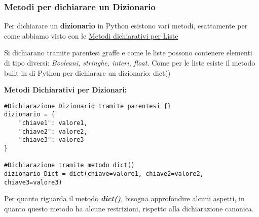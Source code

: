 


\subsubsection{Metodi per dichiarare un Dizionario}\label{DictDichiarazione}
Per dichiarare un \textbf{dizionario} in Python esistono vari metodi, esattamente per come abbiamo visto con le \hyperref[ListeCap1]{Metodi dichiarativi per Liste}

Si dichiarano tramite parentesi graffe \textit{\textbf{{}}} e come le liste possono contenere elementi di tipo diversi: \textit{Booleani, stringhe, interi, float.} Come per le liste esiste il metodo built-in di Python per dichiarare un dizionario: dict()

\vspace{0.5cm}
\textbf{Metodi Dichiarativi per Dizionari:}
\begin{lstlisting}
#Dichiarazione Dizionario tramite parentesi {}
dizionario = {
    "chiave1": valore1,
    "chiave2": valore2,
    "chiave3": valore3
}

#Dichiarazione tramite metodo dict()
dizionario_Dict = dict(chiave=valore1, chiave2=valore2, chiave3=valore3)
\end{lstlisting}
\vspace{0.5cm}
Per quanto riguarda il metodo \textit{\textbf{dict()}}, bisogna approfondire alcuni aspetti, in quanto questo metodo ha alcune restrizioni, rispetto alla dichiarazione canonica.

